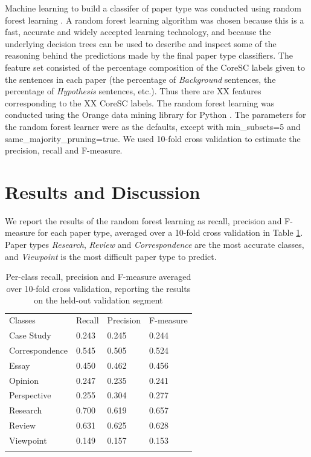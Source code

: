 \documentclass{svmult}
\begin{document}

Machine learning to build a classifer of paper type was conducted using random
forest learning \cite{Breiman2001}.  A random forest learning algorithm was
chosen because this is a fast, accurate and widely accepted learning
technology, and because the underlying decision trees can be used to describe
and inspect some of the reasoning behind the predictions made by the final
paper type classifiers.  The feature set consisted of the percentage
composition of the CoreSC labels given to the sentences in each paper (the
percentage of {\em Background} sentences, the percentage of {\em Hypothesis}
sentences, etc.).  Thus there are XX features corresponding to the XX CoreSC
labels.  The random forest learning was conducted using the Orange data mining
library for Python \cite{Curk2005}.  The parameters for the random forest
learner were as the defaults, except with min\_subsets=5 and same\_majority\_pruning=true.  We used 10-fold cross validation to estimate the precision,
recall and F-measure.


\section{Results and Discussion}
\label{sec:3}

We report the results of the random forest learning as recall, precision and F-measure for each paper type, averaged over a 10-fold cross validation in Table \ref{tab:recallPrecision}. Paper types {\em Research}, {\em Review} and {\em Correspondence} are the most accurate classes, and {\em Viewpoint} is the most difficult paper type to predict. 

\begin{table}
\caption{Per-class recall, precision and F-measure averaged over 10-fold cross validation, reporting the results on the held-out validation segment}
\label{tab:recallPrecision}       %
\begin{tabular}{p{2cm}p{2.4cm}p{2cm}p{4.9cm}}
\hline\noalign{\smallskip}
Classes & Recall & Precision & F-measure  \\
\noalign{\smallskip}\svhline\noalign{\smallskip}
Case Study   &     0.243    &    0.245     &   0.244 \\
Correspondence  &      0.545    &    0.505    &    0.524 \\ 
Essay     &   0.450     &   0.462    &    0.456 \\
Opinion   &     0.247    &    0.235  &      0.241 \\   
Perspective &       0.255  &      0.304  &       0.277 \\
Research     &   0.700    &    0.619    &    0.657 \\
Review      &  0.631     &   0.625     &   0.628 \\
Viewpoint   &     0.149     &   0.157  &      0.153 \\
\noalign{\smallskip}\hline\noalign{\smallskip}
\end{tabular}
\end{table}
\end{document}
